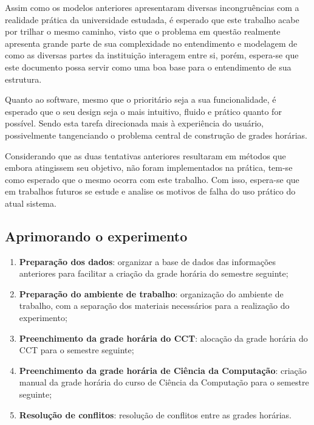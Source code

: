 Assim como os modelos anteriores apresentaram diversas incongruências com a realidade prática da universidade estudada, é esperado que este trabalho acabe por trilhar o mesmo caminho, visto que o problema em questão realmente apresenta grande parte de sua complexidade no entendimento e modelagem de como as diversas partes da instituição interagem entre si, porém, espera-se que este documento possa servir como uma boa base para o entendimento de sua estrutura.

Quanto ao software, mesmo que o prioritário seja a sua funcionalidade, é esperado que o seu design seja o mais intuitivo, fluido e prático quanto for possível. Sendo esta tarefa direcionada mais à experiência do usuário, possivelmente tangenciando o problema central de construção de grades horárias.

Considerando que as duas tentativas anteriores resultaram em métodos que embora atingissem seu objetivo, não foram implementados na prática, tem-se como esperado que o mesmo ocorra com este trabalho. Com isso, espera-se que em trabalhos futuros se estude e analise os motivos de falha do uso prático do atual sistema.



\subsection{Aprimorando o experimento}

\begin{enumerate}
  \item \textbf{Preparação dos dados}: organizar a base de dados das informações anteriores para facilitar a criação da grade horária do semestre seguinte;
  \item \textbf{Preparação do ambiente de trabalho}: organização do ambiente de trabalho, com a separação dos materiais necessários para a realização do experimento;
  \item \textbf{Preenchimento da grade horária do CCT}: alocação da grade horária do CCT para o semestre seguinte;
  \item \textbf{Preenchimento da grade horária de Ciência da Computação}: criação manual da grade horária do curso de Ciência da Computação para o semestre seguinte;
  \item \textbf{Resolução de conflitos}: resolução de conflitos entre as grades horárias.
\end{enumerate}

